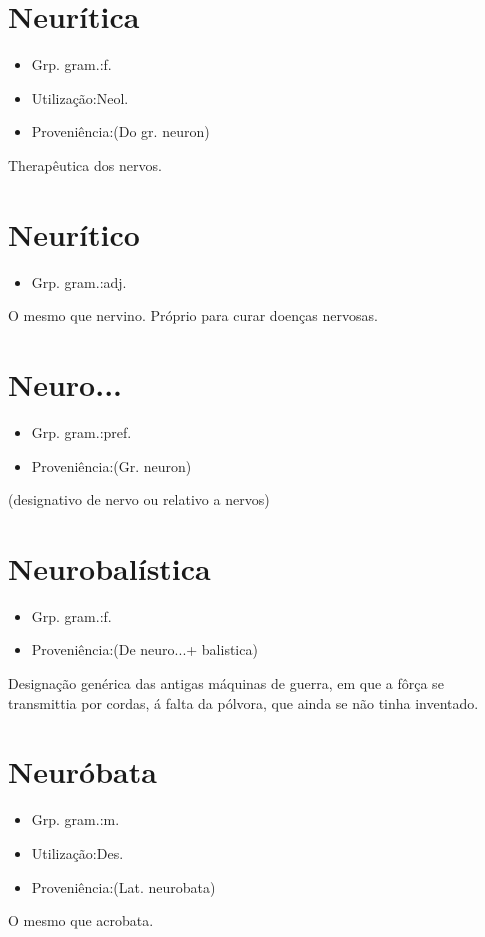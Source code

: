\section{Neurítica}
\begin{itemize}
\item {Grp. gram.:f.}
\end{itemize}
\begin{itemize}
\item {Utilização:Neol.}
\end{itemize}
\begin{itemize}
\item {Proveniência:(Do gr. \textunderscore neuron\textunderscore )}
\end{itemize}
Therapêutica dos nervos.
\section{Neurítico}
\begin{itemize}
\item {Grp. gram.:adj.}
\end{itemize}
O mesmo que \textunderscore nervino\textunderscore .
Próprio para curar doenças nervosas.
\section{Neuro...}
\begin{itemize}
\item {Grp. gram.:pref.}
\end{itemize}
\begin{itemize}
\item {Proveniência:(Gr. \textunderscore neuron\textunderscore )}
\end{itemize}
(designativo de nervo ou relativo a nervos)
\section{Neurobalística}
\begin{itemize}
\item {Grp. gram.:f.}
\end{itemize}
\begin{itemize}
\item {Proveniência:(De \textunderscore neuro...\textunderscore  + \textunderscore balistica\textunderscore )}
\end{itemize}
Designação genérica das antigas máquinas de guerra, em que a fôrça se transmittia por cordas, á falta da pólvora, que ainda se não tinha inventado.
\section{Neuróbata}
\begin{itemize}
\item {Grp. gram.:m.}
\end{itemize}
\begin{itemize}
\item {Utilização:Des.}
\end{itemize}
\begin{itemize}
\item {Proveniência:(Lat. \textunderscore neurobata\textunderscore )}
\end{itemize}
O mesmo que \textunderscore acrobata\textunderscore .
